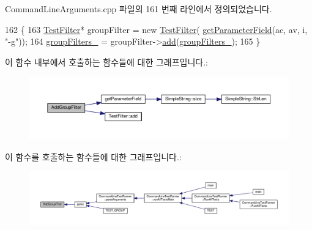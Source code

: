 Command\+Line\+Arguments.\+cpp 파일의 161 번째 라인에서 정의되었습니다.


\begin{DoxyCode}
162 \{
163     \hyperlink{class_test_filter}{TestFilter}* groupFilter = \textcolor{keyword}{new} \hyperlink{class_test_filter}{TestFilter}(
      \hyperlink{class_command_line_arguments_acea2499d001a6bd1a67c2ece97a5632c}{getParameterField}(ac, av, i, \textcolor{stringliteral}{"-g"}));
164     \hyperlink{class_command_line_arguments_a0efdcaf4d54223caffe82738f5db8061}{groupFilters\_} = groupFilter->\hyperlink{class_test_filter_ae532a4739c31605009dfd14f374c8a69}{add}(\hyperlink{class_command_line_arguments_a0efdcaf4d54223caffe82738f5db8061}{groupFilters\_});
165 \}
\end{DoxyCode}


이 함수 내부에서 호출하는 함수들에 대한 그래프입니다.\+:
\nopagebreak
\begin{figure}[H]
\begin{center}
\leavevmode
\includegraphics[width=350pt]{class_command_line_arguments_a5b9e0c238bc7b3bb83f1b0de9bd6cfbc_cgraph}
\end{center}
\end{figure}




이 함수를 호출하는 함수들에 대한 그래프입니다.\+:
\nopagebreak
\begin{figure}[H]
\begin{center}
\leavevmode
\includegraphics[width=350pt]{class_command_line_arguments_a5b9e0c238bc7b3bb83f1b0de9bd6cfbc_icgraph}
\end{center}
\end{figure}


